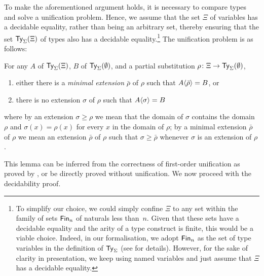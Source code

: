 To make the aforementioned argument holds, it is necessary to compare types and solve a unification problem.
Hence, we assume that the set $\Xi$ of variables has a decidable equality, rather than being an arbitrary set, thereby ensuring that the set $\mathsf{Ty}_{\Sigma}(\Xi)$ of types also has a decidable equality.\footnote{%
To simplify our choice, we could simply confine $\Xi$ to any set within the family of sets $\mathsf{Fin}_n$ of naturals less than~$n$.
Given that these sets have a decidable equality and the arity of a type construct is finite, this would be a viable choice.
Indeed, in our formalisation, we adopt $\mathsf{Fin}_n$ as the set of type variables in the definition of $\mathsf{Ty}_{\Sigma}$ (see  for details).
However, for the sake of clarity in presentation, we keep using named variables and just assume that $\Xi$ has a decidable equality.}
The unification problem is as follows:
\begin{lemma}
  For any $A$ of\/ $\mathsf{Ty}_{\Sigma}(\Xi)$, $B$ of\/ $\mathsf{Ty}_{\Sigma}(\emptyset)$, and a partial substitution $\rho \colon \Xi \to \mathsf{Ty}_{\Sigma}(\emptyset)$, 
  \begin{enumerate}
    \item either there is a \emph{minimal extension} $\bar{\rho}$ of $\rho$ such that ${A}\!\left<{\bar{\rho}}\right> = B$, or 
    \item there is no extension $\sigma$ of $\rho$ such that ${A}\!\left<{\sigma}\right> = B$
  \end{enumerate}
  where by an extension $\sigma \geq \rho$ we mean that the domain of $\sigma$ contains the domain $\rho$ and $\sigma(x) = \rho(x)$ for every $x$ in the domain of $\rho$; by a minimal extension $\bar{\rho}$ of $\rho$ we mean an extension $\bar{\rho}$ of $\rho$ such that $\sigma \geq \bar{\rho}$ whenever $\sigma$ is an extension of $\rho$.
\end{lemma}
This lemma can be inferred from the correctness of first-order unification as proved by \citet{McBride2003,McBride2003a}, or be directly proved without unification.
We now proceed with the decidability proof.

